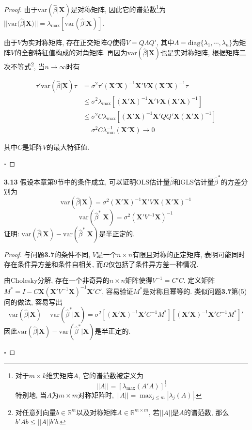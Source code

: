 \documentclass[cn,12pt,math=mtpro2,citestyle=gb7714-2015,bibstyle=gb7714-2015,twocol,mode=simple]{elegantbook}
\newcommand{\var}{\text{var}}
\newcommand{\hbeta}{\hat{\beta}}
\begin{document}
\begin{proof}
  由于$\var(\hbeta|\mathbf{X})$是对称矩阵, 因此它的谱范数\footnote{对于$m\times k$维实矩阵$A$, 它的谱范数被定义为
  $$||A||=[\lambda_{\max}(A'A)]^{\frac{1}{2}}$$
  特别地, 当$A$为$m\times m$对称矩阵时, $||A||=\displaystyle\max_{j\leq m}|\lambda_j(A)|$.}为$||\var(\hbeta|\mathbf{X})||=\lambda_{\max}[\var(\hbeta|\mathbf{X})]$.

  由于$V$为实对称矩阵, 存在正交矩阵$Q$使得$V=Q\Lambda Q'$, 其中$\Lambda=\text{diag}\{\lambda_1,\cdots,\lambda_n\}$为矩阵$V$的全部特征值构成的对角矩阵. 再因为$\var(\hbeta|\mathbf{X})$也是实对称矩阵, 根据矩阵二次不等式\footnote{对任意列向量$b\in\mathbb{R}^m$以及对称矩阵$A\in \mathbb{R}^{m\times m}$, 若$||A||$是$A$的谱范数, 那么$b'Ab\leq ||A||b'b$.}, 当$n \rightarrow \infty$时有

    \begin{align*}
  \tau'\var(\hbeta|\mathbf{X})\tau&=\sigma^2\tau'(\mathbf{X}'\mathbf{X})^{-1}\mathbf{X}'V\mathbf{X}(\mathbf{X}'\mathbf{X})^{-1}\tau \\
  &\leq\sigma^2\lambda_{\max}[(\mathbf{X}'\mathbf{X})^{-1}\mathbf{X}'V\mathbf{X}(\mathbf{X}'\mathbf{X})^{-1}] \\
  &\leq\sigma^2C\lambda_{\max}[(\mathbf{X}'\mathbf{X})^{-1}\mathbf{X}'QQ'\mathbf{X}(\mathbf{X}'\mathbf{X})^{-1}] \\
  &=\sigma^2C\lambda_{\min}^{-1}(\mathbf{X}'\mathbf{X}) \rightarrow 0
  \end{align*}

  \noindent 其中$C$是矩阵$V$的最大特征值.

  $\square$
\end{proof}

\textbf{3.13} 假设本章第9节中的条件成立, 可以证明OLS估计量$\hbeta$和GLS估计量$\hbeta^{\ast}$的方差分别为
$$\var(\hbeta|\mathbf{X})=\sigma^2(\mathbf{X}'\mathbf{X})^{-1}\mathbf{X}'V \mathbf{X}(\mathbf{X}'\mathbf{X})^{-1} $$
$$\var(\hbeta^{\ast}|\mathbf{X})=\sigma^2(\mathbf{X}'V^{-1}\mathbf{X})^{-1}$$
证明: $\var(\hbeta|\mathbf{X})-\var(\hbeta^{\ast}|\mathbf{X})$是半正定的.

\begin{proof}
  与问题\textbf{3.7}的条件不同, $V$是一个$n \times n$有限且对称的正定矩阵, 表明可能同时存在条件异方差和条件自相关, 而$\Omega$仅包括了条件异方差一种情况.

  由Cholesky分解, 存在一个非奇异的$n \times n$矩阵使得$V^{-1}=C'C$. 定义矩阵$M^{\ast}=I-C\mathbf{X}(\mathbf{X}'V^{-1}\mathbf{X})^{-1}\mathbf{X}'C'$, 容易验证$M^{\ast}$是对称且幂等的. 类似问题\textbf{3.7}第(5)问的做法, 容易写出
  $$\var(\hbeta|\mathbf{X})-\var(\hbeta^{\ast}|\mathbf{X})=\sigma^2[(\mathbf{X}'\mathbf{X})^{-1}\mathbf{X}'C^{-1}M^{\ast}][(\mathbf{X}'\mathbf{X})^{-1}\mathbf{X}'C^{-1}M^{\ast}]'$$
  因此$\var(\hbeta|\mathbf{X})-\var(\hbeta^{\ast}|\mathbf{X})$是半正定的.

  $\square$
\end{proof}
\end{document}
